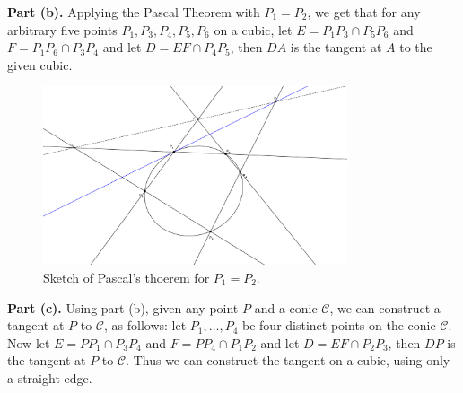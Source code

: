 \documentclass[12pt]{article}
\begin{document}
\textbf{Part (b).} Applying the Pascal Theorem with $P_1 = P_2$, we get that for any arbitrary five points $P_1, P_3, P_4, P_5, P_6$ on a cubic, let $E = P_1 P_3 \cap P_5 P_6$ and $F = P_1 P_6 \cap P_3 P_4$ and let $D = EF \cap P_4 P_5$, then $DA$ is the tangent at $A$ to the given cubic. 
\begin{figure}[H]
   \centering
   \includegraphics[width=0.8\textwidth]{pascal2.png}
   \caption{Sketch of Pascal's thoerem for $P_1 = P_2$.}
\end{figure}

\textbf{Part (c).} Using part (b), given any point $P$ and a conic $\mathcal{C}$, we can construct a tangent at $P$ to $\mathcal{C}$, as follows: let $P_1, \dots, P_4$ be four distinct points on the conic $\mathcal{C}$. Now let $E = PP_1 \cap P_3P_4$ and $F = PP_4 \cap P_1 P_2$ and let $D = EF \cap P_2P_3$, then $DP$ is the tangent at $P$ to $\mathcal{C}$. Thus we can construct the tangent on a cubic, using only a straight-edge.
\end{document}
